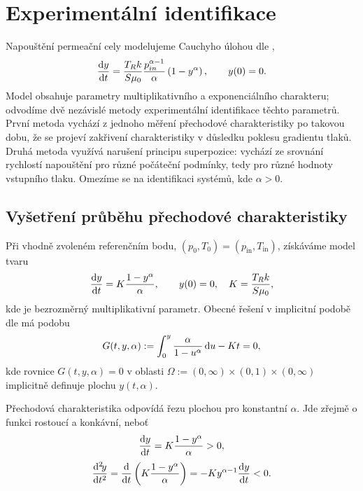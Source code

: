 \section{Experimentální identifikace}\label{s:identification}

Napouštění permeační cely modelujeme Cauchyho úlohou dle ,
\begin{equation}
    \frac{\mathrm{d} y}{\mathrm{d} t}=\frac{T_R k}{S \mu_0}\frac{p_{in}^{\alpha-1}}{\alpha}\left(1-y^\alpha\right),\qquad y(0)=0.
\end{equation}
Model obsahuje parametry multiplikativního a exponenciálního charakteru; odvodíme dvě nezávislé metody experimentální identifikace těchto parametrů. První metoda vychází z jednoho měření přechodové charakteristiky po takovou dobu, že se projeví zakřivení charakteristiky v důsledku poklesu gradientu tlaků. Druhá metoda využívá narušení principu superpozice: vychází ze srovnání rychlostí napouštění pro různé počáteční podmínky, tedy pro různé hodnoty vstupního tlaku. Omezíme se na identifikaci systémů, kde $\alpha>0$.

\subsection{Vyšetření průběhu přechodové charakteristiky}\label{ss:vysetreni_prubehu_prechodove_charakteristiky}
Při vhodně zvoleném referenčním bodu, $(p_0,T_0)=(p_{\mathrm{in}},T_{\mathrm{in}})$, získáváme model tvaru
\begin{equation}
    \frac{\mathrm{d} y}{\mathrm{d} t}=K\frac{1-y^\alpha}{\alpha}, \qquad y(0)=0,\quad K=\frac{T_R k}{S \mu_0},
\end{equation}
kde  je bezrozměrný multiplikativní parametr. Obecné řešení v implicitní podobě dle  má podobu
\begin{equation}\label{eq:implicit_solution_definition}
    G(t,y,\alpha):=\int_0^y\frac{\alpha}{1-u^\alpha} \,\mathrm{d}{u} -Kt=0,
\end{equation}
kde rovnice $G(t,y,\alpha)=0$ v oblasti $\Omega:=(0,\infty)\times (0,1)\times(0,\infty)$ implicitně definuje plochu $y(t,\alpha)$.

Přechodová charakteristika odpovídá řezu plochou pro konstantní $\alpha$. Jde zřejmě o funkci rostoucí a konkávní, neboť
\begin{equation}
    \frac{\mathrm{d} y}{\mathrm{d} t}=K\frac{1-y^\alpha}{\alpha}>0,
\end{equation}
\begin{equation}
    \frac{\mathrm{d}^2 \! y}{\mathrm{d} t^2}=\frac{\mathrm{d} }{\mathrm{d} t}\left(K\frac{1-y^\alpha}{\alpha}\right)=-Ky^{\alpha-1}\frac{\mathrm{d} y}{\mathrm{d} t}<0.
\end{equation}
